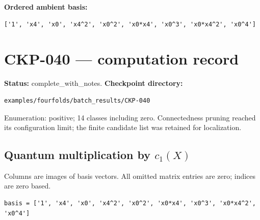 \documentclass[10pt,a4paper]{article}
\begin{document}
\textbf{Ordered ambient basis:}
\begin{lstlisting}
['1', 'x4', 'x0', 'x4^2', 'x0^2', 'x0*x4', 'x0^3', 'x0*x4^2', 'x0^4']
\end{lstlisting}

\clearpage\section*{CKP-040 --- computation record}
\textbf{Status:} complete\_with\_notes.
\textbf{Checkpoint directory:}
\begin{lstlisting}
examples/fourfolds/batch_results/CKP-040
\end{lstlisting}

Enumeration: positive; 14 classes including zero.
Connectedness pruning reached its configuration limit; the finite candidate list was retained for localization.
\subsection*{Quantum multiplication by $c_1(X)$}
Columns are images of basis vectors. All omitted matrix entries are zero; indices are zero based.

\begin{lstlisting}
basis = ['1', 'x4', 'x0', 'x4^2', 'x0^2', 'x0*x4', 'x0^3', 'x0*x4^2', 'x0^4']
\end{lstlisting}
\end{document}
